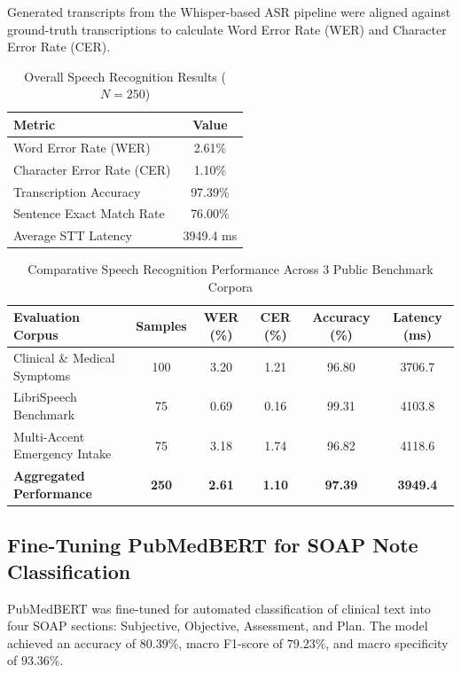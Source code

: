 Generated transcripts from the Whisper-based ASR pipeline were aligned against ground-truth transcriptions to calculate Word Error Rate (WER) and Character Error Rate (CER).

\begin{table}[ht]
\centering
\caption{Overall Speech Recognition Results ($N = 250$)}
\label{tab:speech_results}
\begin{tabular}{|l|c|}
\hline
\textbf{Metric} & \textbf{Value} \\
\hline
Word Error Rate (WER) & 2.61\% \\
Character Error Rate (CER) & 1.10\% \\
Transcription Accuracy & 97.39\% \\
Sentence Exact Match Rate & 76.00\% \\
Average STT Latency & 3949.4 ms \\
\hline
\end{tabular}
\end{table}

\begin{table}[ht]
\centering
\caption{Comparative Speech Recognition Performance Across 3 Public Benchmark Corpora}
\label{tab:speech_comparative_results}
\begin{tabular}{|p{4.5cm}|c|c|c|c|c|}
\hline
\textbf{Evaluation Corpus} & \textbf{Samples} & \textbf{WER (\%)} & \textbf{CER (\%)} & \textbf{Accuracy (\%)} & \textbf{Latency (ms)} \\
\hline
Clinical \& Medical Symptoms & 100 & 3.20 & 1.21 & 96.80 & 3706.7 \\
\hline
LibriSpeech Benchmark & 75 & 0.69 & 0.16 & 99.31 & 4103.8 \\
\hline
Multi-Accent Emergency Intake & 75 & 3.18 & 1.74 & 96.82 & 4118.6 \\
\hline
\textbf{Aggregated Performance} & \textbf{250} & \textbf{2.61} & \textbf{1.10} & \textbf{97.39} & \textbf{3949.4} \\
\hline
\end{tabular}
\end{table}

\subsection{Fine-Tuning PubMedBERT for SOAP Note Classification}

PubMedBERT was fine-tuned for automated classification of clinical text into four SOAP sections: Subjective, Objective, Assessment, and Plan. The model achieved an accuracy of $80.39\%$, macro F1-score of $79.23\%$, and macro specificity of $93.36\%$.

